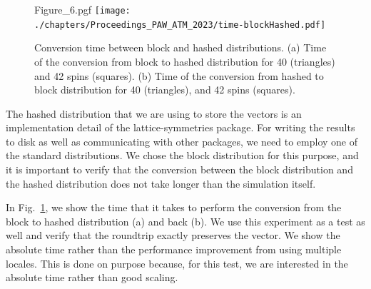 \begin{figure}
  \centering
  {Figure_6.pgf}
  \texttt{[image: ./chapters/Proceedings\_PAW\_ATM\_2023/time-blockHashed.pdf]}
  \caption{Conversion time between block and hashed distributions. (a) Time of the conversion from block to hashed distribution for 40 (triangles) and 42 spins (squares). (b) Time of the conversion from hashed to block distribution for 40 (triangles), and 42 spins (squares).}
  \label{fig:ls23:blockHashed}
\end{figure}



The hashed distribution that we are using to store the vectors is an implementation detail of the lattice-symmetries package. For writing the results to disk as well as communicating with other packages, we need to employ one of the standard distributions. We chose the block distribution for this purpose, and it is important to verify that the conversion between the block distribution and the hashed distribution does not take longer than the simulation itself.

In Fig.~\ref{fig:ls23:blockHashed}, we show the time that it takes to perform the conversion from the block to hashed distribution (a) and back (b). We use this experiment as a test as well and verify that the roundtrip exactly preserves the vector. We show the absolute time rather than the performance improvement from using multiple locales. This is done on purpose because, for this test, we are interested in the absolute time rather than good scaling.

